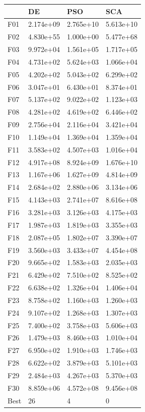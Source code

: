 \begin{tabular}{llll}
\toprule
{} &         DE &        PSO &        SCA \\
\midrule
F01  &  2.174e+09 &  2.765e+10 &  5.613e+10 \\
F02  &  4.830e+55 &  1.000e+00 &  5.477e+68 \\
F03  &  9.972e+04 &  1.561e+05 &  1.717e+05 \\
F04  &  4.731e+02 &  5.624e+03 &  1.066e+04 \\
F05  &  4.202e+02 &  5.043e+02 &  6.299e+02 \\
F06  &  3.047e+01 &  6.430e+01 &  8.374e+01 \\
F07  &  5.137e+02 &  9.022e+02 &  1.123e+03 \\
F08  &  4.281e+02 &  4.619e+02 &  6.446e+02 \\
F09  &  2.756e+04 &  2.116e+04 &  3.421e+04 \\
F10  &  1.149e+04 &  1.369e+04 &  1.359e+04 \\
F11  &  3.583e+02 &  4.507e+03 &  1.016e+04 \\
F12  &  4.917e+08 &  8.924e+09 &  1.676e+10 \\
F13  &  1.167e+06 &  1.627e+09 &  4.814e+09 \\
F14  &  2.684e+02 &  2.880e+06 &  3.134e+06 \\
F15  &  4.143e+03 &  2.741e+07 &  8.616e+08 \\
F16  &  3.281e+03 &  3.126e+03 &  4.175e+03 \\
F17  &  1.987e+03 &  1.819e+03 &  3.355e+03 \\
F18  &  2.087e+05 &  1.802e+07 &  3.390e+07 \\
F19  &  3.560e+03 &  3.433e+07 &  4.454e+08 \\
F20  &  9.665e+02 &  1.583e+03 &  2.035e+03 \\
F21  &  6.429e+02 &  7.510e+02 &  8.525e+02 \\
F22  &  6.638e+02 &  1.326e+04 &  1.406e+04 \\
F23  &  8.758e+02 &  1.160e+03 &  1.260e+03 \\
F24  &  9.107e+02 &  1.268e+03 &  1.307e+03 \\
F25  &  7.400e+02 &  3.758e+03 &  5.606e+03 \\
F26  &  1.479e+03 &  8.460e+03 &  1.010e+04 \\
F27  &  6.950e+02 &  1.910e+03 &  1.746e+03 \\
F28  &  6.622e+02 &  3.879e+03 &  5.101e+03 \\
F29  &  2.484e+03 &  4.267e+03 &  5.370e+03 \\
F30  &  8.859e+06 &  4.572e+08 &  9.456e+08 \\
Best &         26 &          4 &          0 \\
\bottomrule
\end{tabular}
